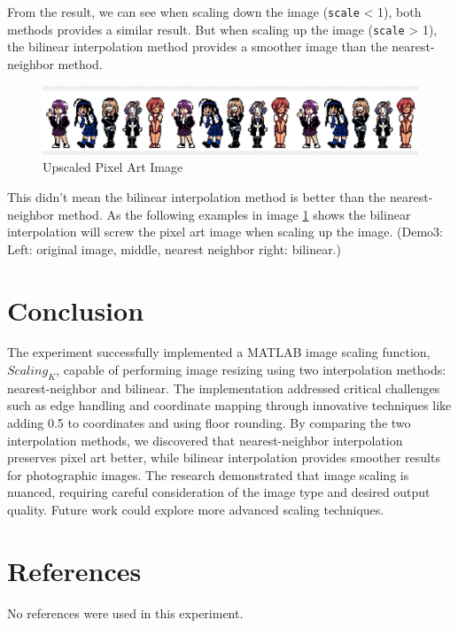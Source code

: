 \documentclass[a4paper,11pt]{article}
\begin{document}
From the result, we can see when scaling down the image (\texttt{scale} < 1), both methods provides a similar result. But when scaling up the image (\texttt{scale} > 1), the bilinear interpolation method provides a smoother image than the nearest-neighbor method.\\

\begin{figure}[H]
    \centering
    \includegraphics[width=0.8\linewidth]{DemoPixel.jpg}
    \caption{Upscaled Pixel Art Image}
    \label{pic:Demo_3}
\end{figure}

This didn't mean the bilinear interpolation method is better than the nearest-neighbor method. As the following examples in image \ref{pic:Demo_3} shows the bilinear interpolation will screw the pixel art image when scaling up the image. (Demo3: Left: original image, middle, nearest neighbor right: bilinear.)\\


\section{Conclusion}
The experiment successfully implemented a MATLAB image scaling function, $Scaling_K$, capable of performing image resizing using two interpolation methods: nearest-neighbor and bilinear. The implementation addressed critical challenges such as edge handling and coordinate mapping through innovative techniques like adding 0.5 to coordinates and using floor rounding. By comparing the two interpolation methods, we discovered that nearest-neighbor interpolation preserves pixel art better, while bilinear interpolation provides smoother results for photographic images. The research demonstrated that image scaling is nuanced, requiring careful consideration of the image type and desired output quality. Future work could explore more advanced scaling techniques.

\section{References}
No references were used in this experiment.
\end{document}
